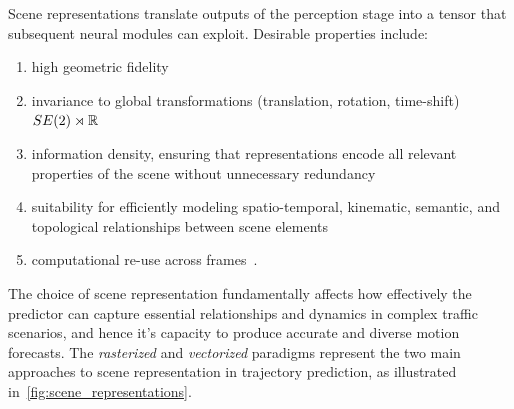 Scene representations translate outputs of the perception stage into a tensor that subsequent neural modules can exploit. Desirable properties include:
\begin{enumerate}[label=\roman*)]
    \item high geometric fidelity
    \item invariance to global transformations (translation, rotation, time-shift) \( SE(2) \rtimes \mathbb{R} \)
    \item information density, ensuring that representations encode all relevant properties of the scene without unnecessary redundancy
    \item suitability for efficiently modeling spatio-temporal, kinematic, semantic, and topological relationships between scene elements
    \item computational re-use across frames~\cite{qcnetZhou2023,lmformerYadav2025}.
\end{enumerate}
The choice of scene representation fundamentally affects how effectively the predictor can capture essential relationships and dynamics in complex traffic scenarios, and hence it's capacity to produce accurate and diverse motion forecasts. The \emph{rasterized} and \emph{vectorized} paradigms represent the two main approaches to scene representation in trajectory prediction, as illustrated in~\autoref{fig:scene_representations}.

